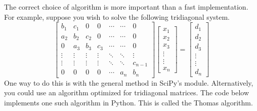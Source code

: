 The correct choice of algorithm is more important than a fast implementation.
For example, suppose you wish to solve the following tridiagonal system.
\[\begin{bmatrix}
b_1 & c_1 & 0 & 0 & \cdots & \cdots & 0 \\
a_2 & b_2 & c_2 & 0 & \cdots & \cdots & 0 \\
0 & a_3 & b_3 & c_3 & \cdots & \cdots & 0 \\
\vdots & \vdots & \vdots & \vdots & \ddots & \ddots & \vdots \\
\vdots & \vdots & \vdots & \vdots & \ddots & \ddots & c_{n-1} \\
0 & 0 & 0 & 0 & \cdots & a_n & b_n
\end{bmatrix}
\begin{bmatrix}
x_1\\
x_2\\
x_3\\
\vdots\\
\vdots\\
x_n
\end{bmatrix}
=
\begin{bmatrix}
d_1\\
d_2\\
d_3\\
\vdots\\
\vdots\\
d_n
\end{bmatrix}\]
One way to do this is with the general  method in SciPy's  module.
Alternatively, you could use an algorithm optimized for tridiagonal matrices.
The code below implements one such algorithm in Python. This is called the Thomas algorithm.

